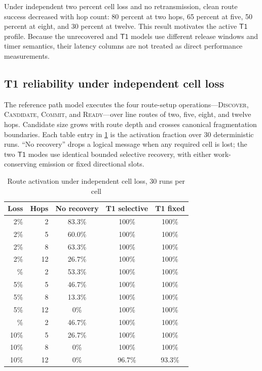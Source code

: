 \documentclass[11pt,oneside]{article}
\newcommand{\Tone}{\ensuremath{\mathsf{T1}}}
\begin{document}
Under independent two percent cell loss and no retransmission, clean route success decreased with hop count: 80 percent at two hops, 65 percent at five, 50 percent at eight, and 30 percent at twelve. This result motivates the active \Tone{} profile. Because the unrecovered and \Tone{} models use different release windows and timer semantics, their latency columns are not treated as direct performance measurements.

\subsection{T1 reliability under independent cell loss}

The reference path model executes the four route-setup operations---\textsc{Discover}, \textsc{Candidate}, \textsc{Commit}, and \textsc{Ready}---over line routes of two, five, eight, and twelve hops. Candidate size grows with route depth and crosses canonical fragmentation boundaries. Each table entry in \cref{tab:t1success} is the activation fraction over 30 deterministic runs. ``No recovery'' drops a logical message when any required cell is lost; the two \Tone{} modes use identical bounded selective recovery, with either work-conserving emission or fixed directional slots.

\begin{table}[ht]
\centering
\caption{Route activation under independent cell loss, 30 runs per cell}
\label{tab:t1success}
\begin{tabular}{@{}rrccc@{}}
\toprule
Loss & Hops & No recovery & T1 selective & T1 fixed \\
\midrule
2\% & 2  & 83.3\% & 100\% & 100\% \\
2\% & 5  & 60.0\% & 100\% & 100\% \\
2\% & 8  & 63.3\% & 100\% & 100\% \\
2\% & 12 & 26.7\% & 100\% & 100\% \\
\addlinespace
5\% & 2  & 53.3\% & 100\% & 100\% \\
5\% & 5  & 46.7\% & 100\% & 100\% \\
5\% & 8  & 13.3\% & 100\% & 100\% \\
5\% & 12 & 0\%    & 100\% & 100\% \\
\addlinespace
10\% & 2  & 46.7\% & 100\% & 100\% \\
10\% & 5  & 26.7\% & 100\% & 100\% \\
10\% & 8  & 0\%    & 100\% & 100\% \\
10\% & 12 & 0\%    & 96.7\% & 93.3\% \\
\bottomrule
\end{tabular}
\end{table}
\end{document}

